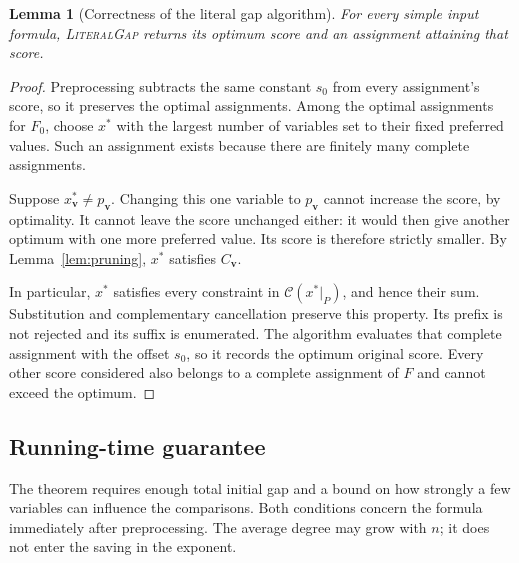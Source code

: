 \documentclass[11pt,a4paper]{article}
\newtheorem{lemma}[theorem]{Lemma}
\theoremstyle{definition}
\theoremstyle{remark}
\begin{document}
\begin{lemma}[Correctness of the literal gap algorithm]\label{lem:gap_correctness}
For every simple input formula, \textnormal{\textsc{LiteralGap}} returns
its optimum score and an assignment attaining that score.
\end{lemma}
\begin{proof}
Preprocessing subtracts the same constant $s_0$ from every assignment's
score, so it preserves the optimal assignments. Among the optimal
assignments for $F_0$, choose $x^*$ with the largest number of variables
set to their fixed preferred values. Such an assignment exists because
there are finitely many complete assignments.

Suppose $x^*_{\mathbf v}\ne p_{\mathbf v}$. Changing this one variable
to $p_{\mathbf v}$ cannot increase the score, by optimality. It cannot
leave the score unchanged either: it would then give another optimum
with one more preferred value. Its score is therefore strictly smaller.
By Lemma~\ref{lem:pruning}, $x^*$ satisfies $C_{\mathbf v}$.

In particular, $x^*$ satisfies every constraint in
$\mathcal C(x^*|_P)$, and hence their sum. Substitution and complementary
cancellation preserve this property. Its prefix is not rejected and its
suffix is enumerated. The algorithm evaluates that complete assignment
with the offset $s_0$, so it records the optimum original score. Every
other score considered also belongs to a complete assignment of $F$ and
cannot exceed the optimum.
\end{proof}

\subsection{Running-time guarantee}

The theorem requires enough total initial gap and a bound on how strongly
a few variables can influence the comparisons. Both conditions concern
the formula immediately after preprocessing. The average degree may grow
with $n$; it does not enter the saving in the exponent.
\end{document}
